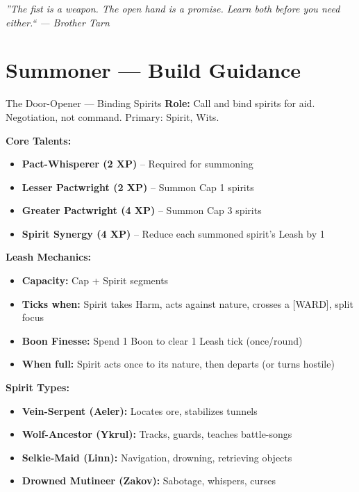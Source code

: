 \documentclass[10pt]{article}
\begin{document}
\vspace{0.5em}
\begin{center}
    {\small\sffamily\itshape ''The fist is a weapon. The open hand is a promise. Learn both before you need either.`` --- Brother Tarn}
\end{center}

\newpage


\section*{Summoner --- Build Guidance}

\begin{tipbox}{The Door-Opener --- Binding Spirits}
    \textbf{Role:} Call and bind spirits for aid. Negotiation, not command. Primary: Spirit, Wits.
    
    \textbf{Core Talents:}
    \begin{itemize}
        \item \textbf{Pact-Whisperer (2 XP)} -- Required for summoning
        \item \textbf{Lesser Pactwright (2 XP)} -- Summon Cap 1 spirits
        \item \textbf{Greater Pactwright (4 XP)} -- Summon Cap 3 spirits
        \item \textbf{Spirit Synergy (4 XP)} -- Reduce each summoned spirit's Leash by 1
    \end{itemize}
    
    \textbf{Leash Mechanics:}
    \begin{itemize}
        \item \textbf{Capacity:} Cap + Spirit segments
        \item \textbf{Ticks when:} Spirit takes Harm, acts against nature, crosses a [WARD], split focus
        \item \textbf{Boon Finesse:} Spend 1 Boon to clear 1 Leash tick (once/round)
        \item \textbf{When full:} Spirit acts once to its nature, then departs (or turns hostile)
    \end{itemize}
    
    \textbf{Spirit Types:}
    \begin{itemize}
        \item \textbf{Vein-Serpent (Aeler):} Locates ore, stabilizes tunnels
        \item \textbf{Wolf-Ancestor (Ykrul):} Tracks, guards, teaches battle-songs
        \item \textbf{Selkie-Maid (Linn):} Navigation, drowning, retrieving objects
        \item \textbf{Drowned Mutineer (Zakov):} Sabotage, whispers, curses
    \end{itemize}
\end{tipbox}
\end{document}
